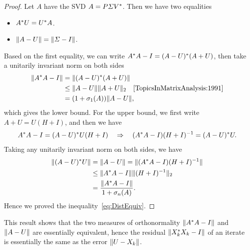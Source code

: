 \documentclass[12pt]{article}
\begin{document}
\begin{proof}
    Let $A$ have the SVD $A=P\varSigma V^*$. Then we have two equalities 
    \begin{itemize}
        \item $A^* U = U^* A$.
        \item $\|{A-U}\| = \|{\varSigma - I}\|$.
    \end{itemize}
    Based on the first equality, we can write $A^* A - I = (A-U)^* (A+U)$, then take a unitarily invariant norm on both sides 
    \begin{equation}
        \notag 
        \begin{aligned}
            \gnorm{A\ctp A - I} &= \gnorm{(A-U)\ctp (A+U)} \\
            & \leq \gnorm{A-U}\norm{A+U}\quad \text{\ycite[1991, Cor.~3.5.10]{TopicsInMatrixAnalysis:1991}}\\
            & = (1+\sigma_1(A))\gnorm{A-U},
        \end{aligned}
    \end{equation}
    which gives the lower bound. For the upper bound, we first write $A+U=U(H+I)$, and then we have 
    \begin{equation}
        \notag 
        A^* A - I = (A - U)^* U(H+I)\quad \Rightarrow \quad (A^* A - I)(H + I)^{-1} = (A-U)^* U.
    \end{equation}
    Taking any unitarily invariant norm on both sides, we have 
    \begin{equation}
        \notag
        \begin{aligned}
            \|{(A-U)^* U}\| &= \|{A-U}\| = \|{(A^* A - I)(H + I)^{-1}}\|\\
            & \leq \|{A^* A - I}\|\|{(H+I)^{-1}}\|_2 \\
            & = \frac{\|{A^* A - I}\|}{1+\sigma_n(A)}.
        \end{aligned}
    \end{equation}
    Hence we proved the inequality~\eqref{eq:DistEquiv}.
\end{proof}

This result shows that the two measures of orthonormality $\|{A^* A - I}\|$ and $\|{A-U}\|$ are essentially equivalent, hence the residual $\|{X_k^* X_k - I}\|$ of an iterate is essentially the same as the error $\|{U-X_k}\|$.
\end{document}
